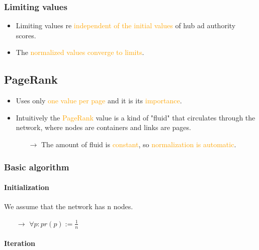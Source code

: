 \subsubsection{Limiting values}

\begin{itemize}
\item Limiting values re \textcolor{orange}{independent of the initial values} of hub ad authority scores.
\item The \textcolor{orange}{normalized values converge to limits}.
\end{itemize}

\subsection{PageRank}

\begin{itemize}
\item Uses only \textcolor{orange}{one value per page} and it is its \textcolor{orange}{importance}.
\item Intuitively the \textcolor{orange}{PageRank} value is a kind of "fluid" that circulates through the network, where nodes are containers and links are pages.
	\begin{itemize}
	\item[$\rightarrow$] The amount of fluid is \textcolor{orange}{constant}, so \textcolor{orange}{normalization is automatic}.
	\end{itemize}
\end{itemize}

\subsubsection{Basic algorithm}

\paragraph{Initialization}

We assume that the network has n nodes.
\begin{itemize}
\item[$\rightarrow$] $\forall p : pr(p) := \frac{1}{n}$
\end{itemize}

\paragraph{Iteration}

